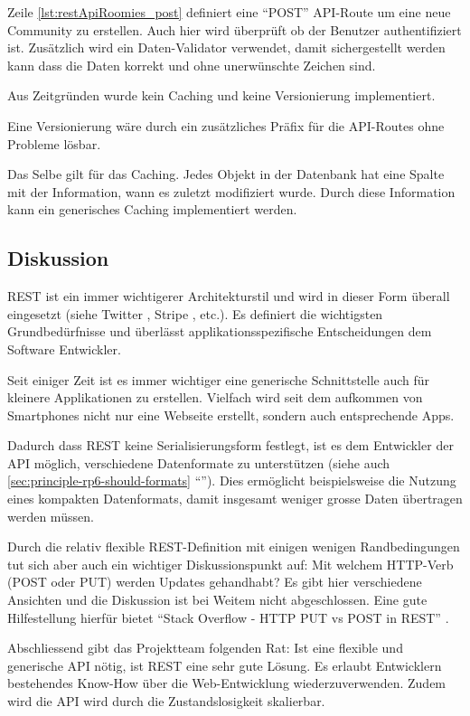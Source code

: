 Zeile \autoref{lst:restApiRoomies_post} definiert eine ``POST'' API-Route um eine neue Community zu erstellen. Auch hier wird überprüft ob der Benutzer authentifiziert ist. Zusätzlich wird ein Daten-Validator verwendet, damit sichergestellt werden kann dass die Daten korrekt und ohne unerwünschte Zeichen sind.

Aus Zeitgründen wurde kein Caching und keine Versionierung implementiert.

Eine Versionierung wäre durch ein zusätzliches Präfix für die API-Routes ohne Probleme lösbar.

Das Selbe gilt für das Caching. Jedes Objekt in der Datenbank hat eine Spalte mit der Information, wann es zuletzt modifiziert wurde. Durch diese Information kann ein generisches Caching implementiert werden.

\subsection*{Diskussion}

\gls{REST} ist ein immer wichtigerer Architekturstil und wird in dieser Form überall eingesetzt (siehe Twitter \cite{TwitterAPI}, Stripe \cite{StripeAPI}, etc.). Es definiert die wichtigsten Grundbedürfnisse und überlässt applikationsspezifische Entscheidungen dem Software Entwickler.

Seit einiger Zeit ist es immer wichtiger eine generische Schnittstelle auch für kleinere Applikationen zu erstellen. Vielfach wird seit dem aufkommen von Smartphones nicht nur eine Webseite erstellt, sondern auch entsprechende Apps.

Dadurch dass \gls{REST} keine Serialisierungsform festlegt, ist es dem Entwickler der API möglich, verschiedene Datenformate zu unterstützen (siehe auch \ref{sec:principle-rp6-should-formats} ``''). Dies ermöglicht beispielsweise die Nutzung eines kompakten Datenformats, damit insgesamt weniger grosse Daten übertragen werden müssen.

Durch die relativ flexible REST-Definition mit einigen wenigen Randbedingungen tut sich aber auch ein wichtiger Diskussionspunkt auf: Mit welchem HTTP-Verb (POST oder PUT) werden Updates gehandhabt? Es gibt hier verschiedene Ansichten und die Diskussion ist bei Weitem nicht abgeschlossen. Eine gute Hilfestellung hierfür bietet ``Stack Overflow - HTTP PUT vs POST in REST'' \cite{StackoverflowPUTvsPOST}.

Abschliessend gibt das Projektteam folgenden Rat: Ist eine flexible und generische API nötig, ist \gls{REST} eine sehr gute Lösung. Es erlaubt Entwicklern bestehendes Know-How über die Web-Entwicklung wiederzuverwenden. Zudem wird die API wird durch die Zustandslosigkeit skalierbar.